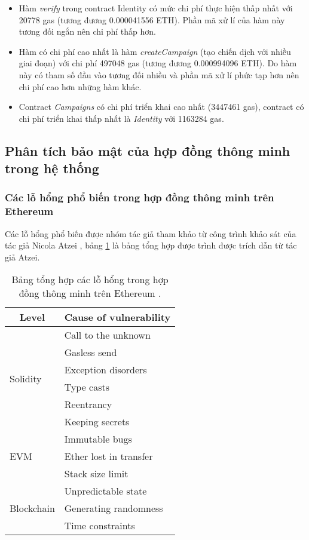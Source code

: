\documentclass[../main-report.tex]{subfiles}
\begin{document}
\begin{itemize}
\item Hàm \textit{verify} trong contract Identity có mức chi phí thực hiện thấp nhất với 20778 gas (tương đương 0.000041556 ETH). Phần mã xử lí của hàm này tương đối ngắn nên chi phí thấp hơn.
\item Hàm có chi phí cao nhất là hàm \textit{createCampaign} (tạo chiến dịch với nhiều giai đoạn) với chi phí 497048 gas (tương đương 0.000994096 ETH). Do hàm này có tham số đầu vào tương đối nhiều và phần mã xử lí phức tạp hơn nên chi phí cao hơn những hàm khác.
\item Contract \textit{Campaigns} có chi phí triển khai cao nhất (3447461 gas), contract có chi phí triển khai thấp nhất là \textit{Identity} với 1163284 gas.
\end{itemize}
\subsection{Phân tích bảo mật của hợp đồng thông minh trong hệ thống}
\subsubsection{Các lỗ hổng phổ biến trong hợp đồng thông minh trên Ethereum}
Các lỗ hổng phổ biến được nhóm tác giả tham khảo từ công trình khảo sát của tác giả Nicola Atzei \cite{atzei2016survey}, bảng \ref{tab:smartcontract-vuln} là bảng tổng hợp được trình được trích dẫn từ tác giả Atzei.

\begin{table}[!ht]
\centering
\begin{tabular}{|l|l|}
\hline
\multicolumn{1}{|c|}{\textbf{Level}} & \multicolumn{1}{c|}{\textbf{Cause of vulnerability}} \\ \hline
\multirow{6}{*}{Solidity} & Call to the unknown \\ \cline{2-2} 
 & Gasless send \\ \cline{2-2} 
 & Exception disorders \\ \cline{2-2} 
 & Type casts \\ \cline{2-2} 
 & Reentrancy \\ \cline{2-2} 
 & Keeping secrets \\ \hline
\multirow{3}{*}{EVM} & Immutable bugs \\ \cline{2-2} 
 & Ether lost in transfer \\ \cline{2-2} 
 & Stack size limit \\ \hline
\multirow{3}{*}{Blockchain} & Unpredictable state \\ \cline{2-2} 
 & Generating randomness \\ \cline{2-2} 
 & Time constraints \\ \hline
\end{tabular}
\caption{Bảng tổng hợp các lỗ hổng trong hợp đồng thông minh trên Ethereum \cite{atzei2016survey}.}
\label{tab:smartcontract-vuln}
\end{table}
\end{document}
